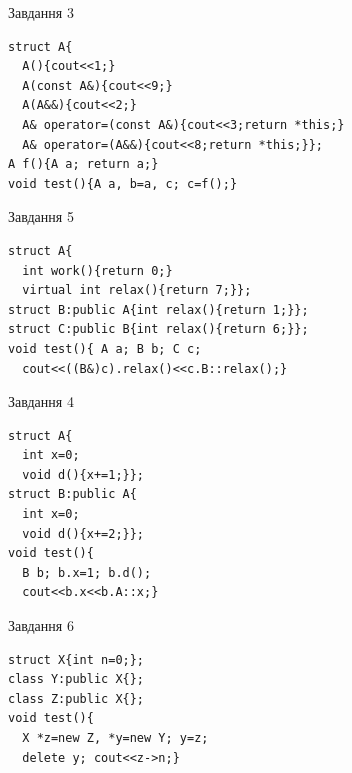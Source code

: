 \documentclass[12pt, ukrainian]{article}
\begin{document}
{{{{{{{{{{{{{{{\begin{minipage}[t]{11cm}
               
{\begin{center}Завдання {3}\end{center}}
\vspace{-6mm}

\begin{verbatim}
struct A{
  A(){cout<<1;}
  A(const A&){cout<<9;}
  A(A&&){cout<<2;}
  A& operator=(const A&){cout<<3;return *this;}
  A& operator=(A&&){cout<<8;return *this;}};
A f(){A a; return a;}
void test(){A a, b=a, c; c=f();}
\end{verbatim}            


               
{\begin{center}Завдання {5}\end{center}}
\vspace{-6mm}

\begin{verbatim}
struct A{
  int work(){return 0;}
  virtual int relax(){return 7;}};
struct B:public A{int relax(){return 1;}};
struct C:public B{int relax(){return 6;}};
void test(){ A a; B b; C c;
  cout<<((B&)c).relax()<<c.B::relax();}
\end{verbatim}            


\end{minipage}
\vline \hspace{8mm}
\begin{minipage}[t]{7cm}
               
{\begin{center}Завдання {4}\end{center}}
\vspace{-6mm}

\begin{verbatim}
struct A{
  int x=0;
  void d(){x+=1;}};
struct B:public A{
  int x=0;
  void d(){x+=2;}};
void test(){
  B b; b.x=1; b.d();
  cout<<b.x<<b.A::x;}
\end{verbatim}            


               
{\begin{center}Завдання {6}\end{center}}
\vspace{-6mm}

\begin{verbatim}
struct X{int n=0;};
class Y:public X{};
class Z:public X{};
void test(){
  X *z=new Z, *y=new Y; y=z;
  delete y; cout<<z->n;}
\end{verbatim}            



\end{minipage}}}}}}}}}}}}}}}}
\end{document}
